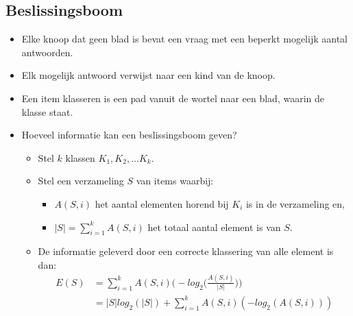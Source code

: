\subsection{Beslissingsboom}
	\begin{itemize}
		\item Elke knoop dat geen blad is bevat een vraag met een beperkt mogelijk aantal antwoorden.
		\item Elk mogelijk antwoord verwijst naar een kind van de knoop.
		\item Een item klasseren is een pad vanuit de wortel naar een blad, waarin de klasse staat.
		\item Hoeveel informatie kan een beslissingsboom geven?
		\begin{itemize}
			\item Stel $k$ klassen $K_1, K_2, ... K_k$.
			\item Stel een verzameling $S$ van items waarbij:
			\begin{itemize}
				\item $A(S, i)$ het aantal elementen horend bij $K_i$ is in de verzameling en,
				\item $|S| = \sum_{i = 1}^k A(S,i)$ het totaal aantal element is van $S$.
			\end{itemize} 
			\item De informatie geleverd door een correcte klassering van alle element is dan:
			\begin{equation*}
				\begin{split}
					E(S) & = \sum_{i = 1}^{k} A(S, i) \bigg(-log_2 \bigg( \frac{A(S, i)}{|S|}\bigg) \bigg) \\
					     & = |S|log_2(|S|) +  \sum_{i = 1}^{k} A(S, i)(-log_2(A(S, i)))
				\end{split}
			\end{equation*}
		\end{itemize}
		\end{itemize}
